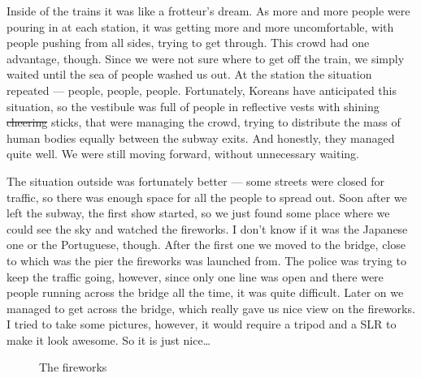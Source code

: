 \begin{post}
\begin{content}
Inside of the trains it was like a frotteur's dream. As more and more people were pouring in at each station, it was getting more and more uncomfortable, with people pushing from all sides, trying to get through. This crowd had one advantage, though. Since we were not sure where to get off the train, we simply waited until the sea of people washed us out. At the station the situation repeated --- people, people, people. Fortunately, Koreans have anticipated this situation, so the vestibule was full of people in reflective vests with shining \sout{cheering} sticks, that were managing the crowd, trying to distribute the mass of human bodies equally between the subway exits. And honestly, they managed quite well. We were still moving forward, without unnecessary waiting.

The situation outside was fortunately better --- some streets were closed for traffic, so there was enough space for all the people to spread out. Soon after we left the subway, the first show started, so we just found some place where we could see the sky and watched the fireworks. I don't know if it was the Japanese one or the Portuguese, though. After the first one we moved to the bridge, close to which was the pier the fireworks was launched from. The police was trying to keep the traffic going, however, since only one line was open and there were people running across the bridge all the time, it was quite difficult. Later on we managed to get across the bridge, which really gave us nice view on the fireworks. I tried to take some pictures, however, it would require a tripod and a SLR to make it look awesome. So it is just nice\ldots

\begin{figure}[h]
\centering
{}
\caption{The fireworks}
\end{figure}


\end{content}
\end{post}
